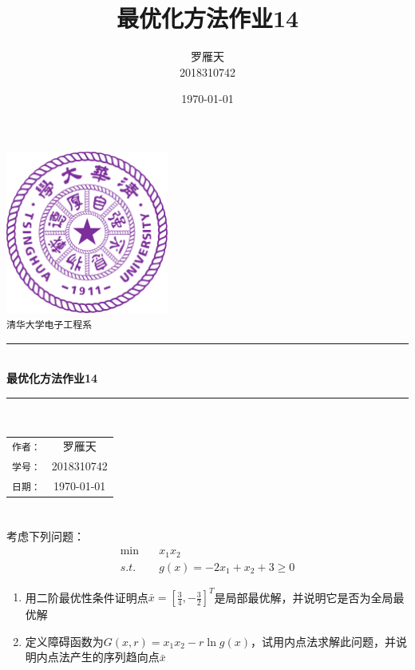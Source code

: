 \documentclass[a4paper,12pt]{article}
\title{最优化方法作业14}
\author{罗雁天 \\
2018310742}
\date{\today}
\begin{document}
\newcommand{\HRule}{\rule{\linewidth}{0.5mm}}
\begin{titlepage}
	\begin{center}
		\includegraphics[width=0.4\textwidth]{Tsinghua2.png}\\[1cm]
		\textsc{\Large \texttt{清华大学电子工程系}}\\[1cm]
		\HRule \\[1cm]
		{\Huge \bfseries 最优化方法作业14}\\[0.4cm]
		\HRule \\[3.5cm]
		\begin{minipage}{0.4\textwidth}
			\begin{center}
				\Large
				\begin{tabular}{cc}
					\texttt{作者：} & 罗雁天 \\[0.5cm]
					\texttt{学号：} & 2018310742 \\[0.5cm]
					\texttt{日期：} & \today
				\end{tabular}
			\end{center}
		\end{minipage}
		\vfill
	\end{center}
\end{titlepage}

\section{}
考虑下列问题：
\begin{equation}
\begin{aligned}
\min \quad &x_1x_2 \\
s.t. \quad &g(x)=-2x_1+x_2+3\ge 0
\end{aligned}
\end{equation}
\begin{enumerate}[(1)]
	\item 用二阶最优性条件证明点$\bar{x}=\left[\frac{3}{4},-\frac{3}{2}\right]^T$是局部最优解，并说明它是否为全局最优解
	\item 定义障碍函数为$G(x,r)=x_1x_2-r\ln g(x)$，试用内点法求解此问题，并说明内点法产生的序列趋向点$\bar{x}$
\end{enumerate}
\end{document}

